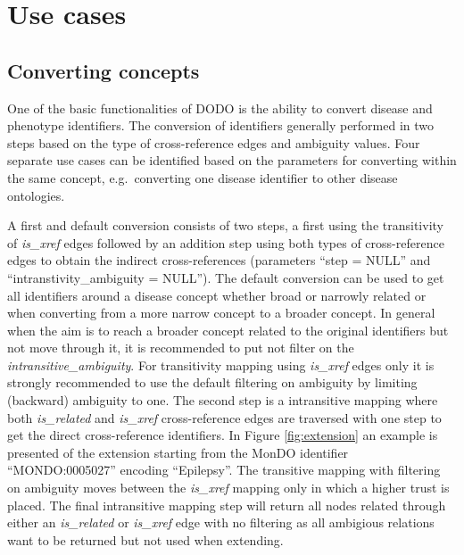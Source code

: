 \documentclass[9pt,a4paper,]{extarticle}
\begin{document}
\hypertarget{use-cases}{%
\section{Use cases}\label{use-cases}}

\hypertarget{converting-concepts}{%
\subsection{Converting concepts}\label{converting-concepts}}

One of the basic functionalities of DODO is the ability to convert disease and phenotype identifiers. The conversion of identifiers generally performed in two steps based on the type of cross-reference edges and ambiguity values. Four separate use cases can be identified based on the parameters for converting within the same concept, e.g.~converting one disease identifier to other disease ontologies.

A first and default conversion consists of two steps, a first using the transitivity of \emph{is\_xref} edges followed by an addition step using both types of cross-reference edges to obtain the indirect cross-references (parameters ``step = NULL'' and ``intranstivity\_ambiguity = NULL''). The default conversion can be used to get all identifiers around a disease concept whether broad or narrowly related or when converting from a more narrow concept to a broader concept. In general when the aim is to reach a broader concept related to the original identifiers but not move through it, it is recommended to put not filter on the \emph{intransitive\_ambiguity}. For transitivity mapping using \emph{is\_xref} edges only it is strongly recommended to use the default filtering on ambiguity by limiting (backward) ambiguity to one. The second step is a intransitive mapping where both \emph{is\_related} and \emph{is\_xref} cross-reference edges are traversed with one step to get the direct cross-reference identifiers. In Figure \ref{fig:extension} an example is presented of the extension starting from the MonDO identifier ``MONDO:0005027'' encoding ``Epilepsy''. The transitive mapping with filtering on ambiguity moves between the \emph{is\_xref} mapping only in which a higher trust is placed. The final intransitive mapping step will return all nodes related through either an \emph{is\_related} or \emph{is\_xref} edge with no filtering as all ambigious relations want to be returned but not used when extending.
\end{document}
